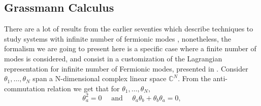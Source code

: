 

\subsection{Grassmann Calculus}
There are a lot of results from the earlier seventies which describe techniques to study systems with infinite number of fermionic modes \cite{soper_construction_1978}, nonetheless, the formalism we are going to present here is a specific case where  a finite number of modes is considered, and consist in a customization of the Lagrangian representation for infinite number of Fermionic modes, presented in \cite{bravyi_classical_2005}. 
Consider $\theta_{1},\ldots,\theta_N$ span a N-dimensional complex linear space $\mathbb{C}^{N}$. From the anti-commutation relation we get that for $\theta_{1},\ldots,\theta_N$,
\begin{equation}
\theta_{a}^{2}=0 \quad \text { and } \quad \theta_{a} \theta_{b}+\theta_{b} \theta_{a}=0,
\label{CH2:Grassmann_anticommutation}
\end{equation}

